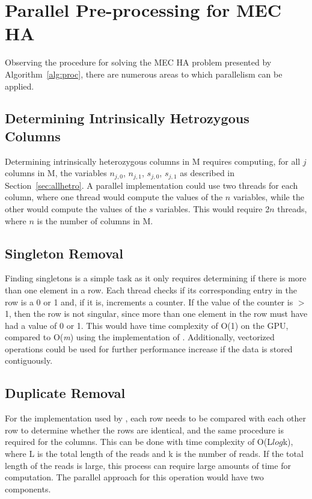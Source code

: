 \documentclass[10pt,twocolumn]{article}
\begin{document}
\section{Parallel Pre-processing for MEC HA } \label{sec:parpre}

Observing the procedure for solving the MEC HA problem presented by Algorithm~\ref{alg:proc}, there are 
numerous areas to which parallelism can be applied.

\subsection{ Determining Intrinsically Hetrozygous Columns}

Determining intrinsically heterozygous columns in M requires computing, for all $j$ columns in M, the
variables $n_{j,0}$, $n_{j,1}$, $s_{j,0}$, $s_{j,1}$ as described in Section~\ref{sec:allhetro}.
A parallel implementation could use two threads for each column, where one thread would compute the values of the
$n$ variables, while the other would compute the values of the $s$ variables. This would require 2$n$ threads,
where $n$ is the number of columns in M.

\subsection{Singleton Removal}

Finding singletons is a simple task as it only requires determining if there is more than one element in a
row. Each thread checks if  its corresponding entry in the row is a 0 or 1 and, if it is, increments a
counter. If the value of the counter is $>$ 1, then the row is not singular, since more than one element in 
the row must have had a value of 0 or 1. This would have time complexity of O(1) on the GPU, compared to 
O(\textit{m}) using the implementation of \cite{chen:2013}. Additionally, vectorized operations could be used
for further performance increase if the data is stored contiguously.

\subsection{Duplicate Removal}

For the implementation used by \cite{chen:2013}, each row needs to be compared with each other row to
determine whether the rows are identical, and the same procedure is required for the columns. This can be done with
time complexity of O(L$log$k), where L is the total length of the reads and k is the number of reads. If the
total length of the reads is large, this process can require large amounts of time for computation. The 
parallel approach for this operation would have two components.
\end{document}
